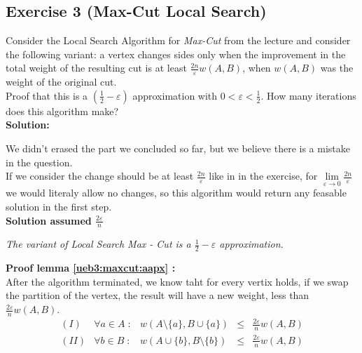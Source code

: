 \subsection*{Exercise 3 \mdseries (Max-Cut Local Search)}

Consider the Local Search Algorithm for \emph{Max-Cut} from the lecture and consider the following variant: a vertex changes sides only when the improvement in the total weight of the resulting cut is at least $\frac{2n}{\varepsilon}w(A,B)$, when $w(A,B)$ was the weight of the original cut.\\

Proof that this is a $(\frac{1}{2} - \varepsilon)$ approximation with $0 < \varepsilon < \frac{1}{2}$. How many iterations does this algorithm make?\\

\textbf{Solution:}

We didn't erased the part we concluded so far, but we believe there is a mistake in the question.\\

If we consider the change should be at least $\frac{2n}{\varepsilon}$ like in in the exercise, for $\underset{\varepsilon \rightarrow 0}{\lim} \frac{2n}{\varepsilon}$ we would literaly allow no changes, so this algorithm would return any feasable solution in the first step.\\


\textbf{Solution assumed $\frac{2\varepsilon}{n}$}\\

\begin{lemma}\label{ueb3:maxcut:aapx}
{\rmfamily\itshape
The variant of Local Search Max - Cut is a $\frac{1}{2} - \varepsilon$ approximation.
}
\end{lemma}

\textbf{Proof lemma \ref{ueb3:maxcut:aapx} : }\\
After the algorithm terminated, we know taht for every vertix holds, if we swap the partition
of the vertex, the result will have a new weight, less than $\frac{2\varepsilon}{n}w(A,B)$.\\


$$\begin{array}{ccrcl}
(I) & \forall a \in A \; : & w(A\setminus\{a\}, B \cup \{a\}) & \leq & \frac{2\varepsilon}{n}w(A,B)\\
(II) & \forall b \in B \; : & w(A \cup \{b\} , B \setminus \{b\}) & \leq & \frac{2\varepsilon}{n}w(A,B)
\end{array}$$

